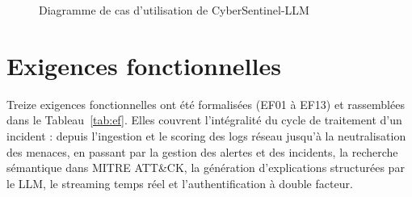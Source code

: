 \documentclass[12pt,a4paper]{report}
\begin{document}
\begin{figure}[H]
{
}
\caption{Diagramme de cas d'utilisation de CyberSentinel-LLM}
\label{fig:usecase}
\end{figure}

\section{Exigences fonctionnelles}
\begin{onehalfspace}
Treize exigences fonctionnelles ont été formalisées (EF01 à EF13) et
rassemblées dans le Tableau~\ref{tab:ef}. Elles couvrent l'intégralité du
cycle de traitement d'un incident : depuis l'ingestion et le scoring des logs
réseau jusqu'à la neutralisation des menaces, en passant par la gestion des
alertes et des incidents, la recherche sémantique dans MITRE ATT\&CK,
la génération d'explications structurées par le LLM, le streaming temps réel
et l'authentification à double facteur.
\end{onehalfspace}
\end{document}
